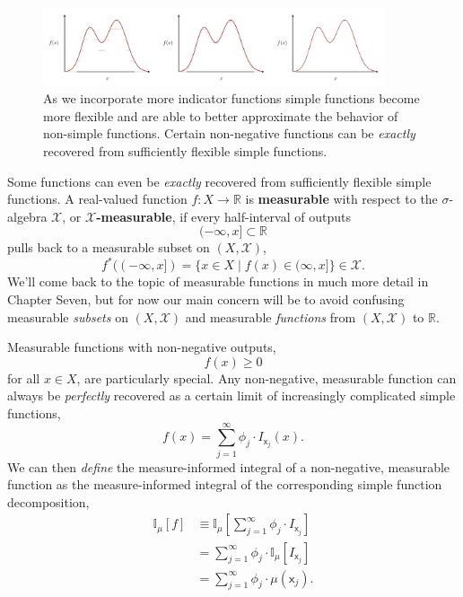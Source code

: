 \documentclass[
  letterpaper,
  DIV=11,
  numbers=noendperiod]{scrartcl}
\begin{document}
\begin{figure}

{\centering \includegraphics[width=0.9\textwidth,height=\textheight]{figures/simple_function_approx/simple_function_approx.pdf}

}

\caption{\label{fig-simple-approx}As we incorporate more indicator
functions simple functions become more flexible and are able to better
approximate the behavior of non-simple functions. Certain non-negative
functions can be \emph{exactly} recovered from sufficiently flexible
simple functions.}

\end{figure}

Some functions can even be \emph{exactly} recovered from sufficiently
flexible simple functions. A real-valued function
\(f: X \rightarrow \mathbb{R}\) is \textbf{measurable} with respect to
the \(\sigma\)-algebra \(\mathcal{X}\), or
\textbf{\(\mathcal{X}\)-measurable}, if every half-interval of outputs
\[
(-\infty, x] \subset \mathbb{R}
\] pulls back to a measurable subset on \((X, \mathcal{X})\), \[
f^{*}( (-\infty, x] )
=
\{ x \in X \mid f(x) \in (\infty, x] \}
\in \mathcal{X}.
\] We'll come back to the topic of measurable functions in much more
detail in Chapter Seven, but for now our main concern will be to avoid
confusing measurable \emph{subsets} on \((X, \mathcal{X})\) and
measurable \emph{functions} from \((X, \mathcal{X})\) to \(\mathbb{R}\).

Measurable functions with non-negative outputs, \[
f(x) \ge 0
\] for all \(x \in X\), are particularly special. Any non-negative,
measurable function can always be \emph{perfectly} recovered as a
certain limit of increasingly complicated simple functions, \[
f(x) = \sum_{j = 1}^{\infty} \phi_{j} \cdot I_{\mathsf{x}_{j}}(x).
\] We can then \emph{define} the measure-informed integral of a
non-negative, measurable function as the measure-informed integral of
the corresponding simple function decomposition, \begin{align*}
\mathbb{I}_{\mu}[f]
&\equiv
\mathbb{I}_{\mu} \left[
\sum_{j = 1}^{\infty} \phi_{j} \cdot I_{\mathsf{x}_{j}} \right]
\\
&=
\sum_{j = 1}^{\infty} \phi_{j} \cdot
\mathbb{I}_{\mu} \left[I_{\mathsf{x}_{j}} \right]
\\
&=
\sum_{j = 1}^{\infty} \phi_{j} \cdot
\mu(\mathsf{x}_{j}).
\end{align*}
\end{document}
